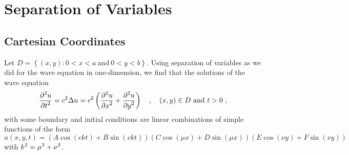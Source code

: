 \section{Separation of Variables}

\subsection{Cartesian Coordinates}

Let $D = \left\{ (x,y) : 0 < x < a \ \text{and} \ 0 < y < b \right\}$.
Using separation of variables as we did for the wave equation in
one-dimension, we find that the solutions of the wave
equation
\[
\frac{\displaystyle \partial^{2}{u}} {\displaystyle \partial t^{2}} = c^2 \Delta u = c^2 \left(\frac{\displaystyle \partial^{2}{u}} {\displaystyle \partial x^{2}} +
\frac{\displaystyle \partial^{2}{u}} {\displaystyle \partial y^{2}}\right) \quad , \quad (x,y) \in D\ \text{and} \ t > 0\ ,
\]
with some boundary and initial conditions are linear combinations of
simple functions of the form
\[
u(x,y,t) = (A \cos (ckt) + B \sin (ckt))(C \cos (\mu x) +
D \sin (\mu x))(E \cos (\nu y) + F \sin (\nu y))
\]
with $\displaystyle k^2 = \mu^2 + \nu^2$.

